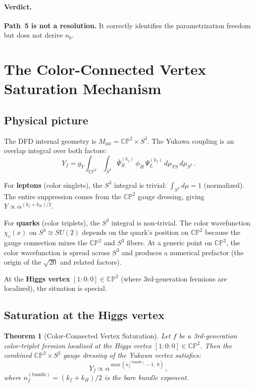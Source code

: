 \documentclass[11pt,a4paper]{article}
\newcommand{\CP}{\mathbb{CP}}
\newtheorem{theorem}{Theorem}
\theoremstyle{definition}
\theoremstyle{remark}
\begin{document}
\paragraph{Verdict.}  \textbf{Path~5 is not a resolution.}  It correctly
identifies the parametrization freedom but does not derive $n_b$.

\section{The Color-Connected Vertex Saturation Mechanism}
\label{sec:mechanism}

\subsection{Physical picture}

The DFD internal geometry is $M_{\text{int}} = \CP^2 \times S^3$.
The Yukawa coupling is an overlap integral over both factors:
\begin{equation}\label{eq:yukawa-full}
Y_f = g_Y \int_{\CP^2} \int_{S^3}
  \bar{\Psi}_R^{(k_f)}\,\phi_H\,\Psi_L^{(k_f)}\,
  d\mu_{FS}\,d\mu_{S^3}\,.
\end{equation}

For \textbf{leptons} (color singlets), the $S^3$ integral is trivial:
$\int_{S^3} d\mu = 1$ (normalized).  The entire suppression comes from
the $\CP^2$ gauge dressing, giving $Y \propto \alpha^{(k_f + k_H)/2}$.

For \textbf{quarks} (color triplets), the $S^3$ integral is non-trivial.
The color wavefunction $\chi_c(x)$ on $S^3 \cong SU(2)$ depends on the
quark's position on $\CP^2$ because the gauge connection mixes the
$\CP^2$ and $S^3$ fibers.  At a generic point on $\CP^2$, the color
wavefunction is spread across $S^3$ and produces a numerical prefactor
(the origin of the $\sqrt{20}$ and related factors).

At the \textbf{Higgs vertex} $[1:0:0] \in \CP^2$ (where 3rd-generation
fermions are localized), the situation is special.

\subsection{Saturation at the Higgs vertex}

\begin{theorem}[Color-Connected Vertex Saturation]
\label{thm:saturation}
Let $f$ be a 3rd-generation color-triplet fermion localized at the
Higgs vertex $[1:0:0] \in \CP^2$.  Then the combined
$\CP^2 \times S^3$ gauge dressing of the Yukawa vertex satisfies:
\begin{equation}
Y_f \propto \alpha^{\max(n_f^{(\text{bundle})} - 1,\; 0)}\,,
\end{equation}
where $n_f^{(\text{bundle})} = (k_f + k_H)/2$ is the bare bundle exponent.
\end{theorem}
\end{document}
